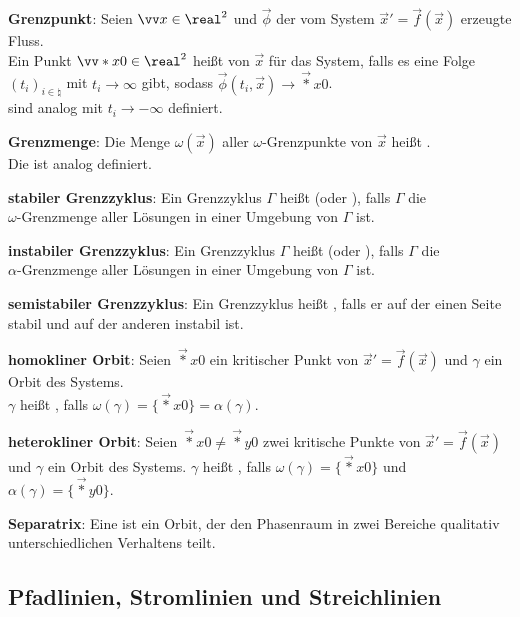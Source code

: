\textbf{Grenzpunkt}:
Seien $\vec{x} \in \real^2$ und $\vec{\phi}$ der vom System $\vec{x}' = \vec{f}(\vec{x})$
erzeugte Fluss.\\
Ein Punkt $\vec*{x}{0} \in \real^2$ heißt  von $\vec{x}$
für das System, falls es eine Folge $(t_i)_{i \in \natural}$
mit $t_i \to \infty$ gibt, sodass $\vec{\phi}(t_i, \vec{x}) \to \vec*{x}{0}$.\\
 sind analog mit $t_i \to -\infty$ definiert.

\textbf{Grenzmenge}:
Die Menge $\omega(\vec{x})$ aller $\omega$-Grenzpunkte von $\vec{x}$ heißt
.\\
Die  ist analog definiert.

\linie

\textbf{stabiler Grenzzyklus}:
Ein Grenzzyklus $\Gamma$ heißt 
(oder ), falls $\Gamma$ die\\
$\omega$-Grenzmenge aller Lösungen in einer Umgebung von $\Gamma$ ist.

\textbf{instabiler Grenzzyklus}:
Ein Grenzzyklus $\Gamma$ heißt 
(oder ), falls $\Gamma$ die\\
$\alpha$-Grenzmenge aller Lösungen in einer Umgebung von $\Gamma$ ist.

\textbf{semistabiler Grenzzyklus}:
Ein Grenzzyklus heißt , falls er auf der einen Seite stabil und auf der
anderen instabil ist.

\linie

\textbf{homokliner Orbit}:
Seien $\vec*{x}{0}$ ein kritischer Punkt von $\vec{x}' = \vec{f}(\vec{x})$
und $\gamma$ ein Orbit des Systems.\\
$\gamma$ heißt , falls $\omega(\gamma) = \{\vec*{x}{0}\} = \alpha(\gamma)$.

\textbf{heterokliner Orbit}:
Seien $\vec*{x}{0} \not= \vec*{y}{0}$ zwei kritische Punkte von $\vec{x}' = \vec{f}(\vec{x})$
und $\gamma$ ein Orbit des Systems.
$\gamma$ heißt , falls $\omega(\gamma) = \{\vec*{x}{0}\}$
und $\alpha(\gamma) = \{\vec*{y}{0}\}$.

\textbf{Separatrix}:
Eine  ist ein Orbit, der den Phasenraum in zwei Bereiche
qualitativ unterschiedlichen Verhaltens teilt.

\pagebreak

\subsection{%
    Pfadlinien, Stromlinien und Streichlinien%
}

